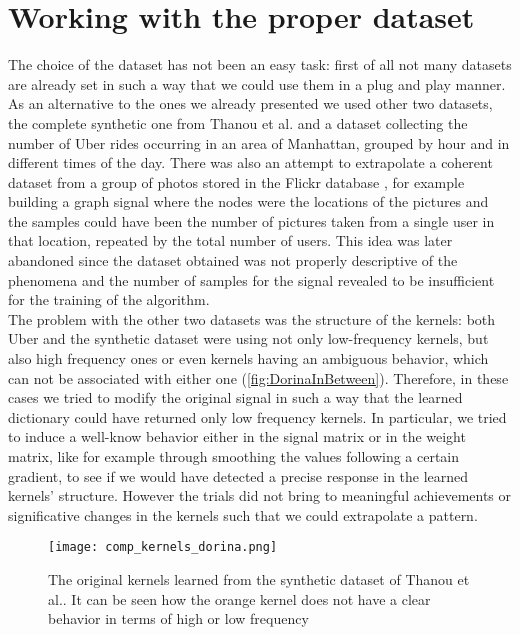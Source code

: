\section{Working with the proper dataset}
The choice of the dataset has not been an easy task: first of all not many datasets are already set in such a way that we could use them in a plug and play manner.\\
As an alternative to the ones we already presented we used other two datasets, the complete synthetic one from Thanou et al. and a dataset collecting the number of Uber rides occurring in an area of Manhattan, grouped by hour and in different times of the day. There was also an attempt to extrapolate a coherent dataset from a group of photos stored in the Flickr database \cite{McAuley2012}, for example building a graph signal where the nodes were the locations of the pictures and the samples could have been the number of pictures taken from a single user in that location, repeated by the total number of users. This idea was later abandoned since the dataset obtained was not properly descriptive of the phenomena and the number of samples for the signal revealed to be insufficient for the training of the algorithm.\\

The problem with the other two datasets was the structure of the kernels: both Uber and the synthetic dataset were using not only low-frequency kernels, but also high frequency ones or even kernels having an ambiguous behavior, which can not be associated with either one (\autoref{fig:DorinaInBetween}). Therefore, in these cases we tried to modify the original signal in such a way that the learned dictionary could have returned only low frequency kernels. In particular, we tried to induce a well-know behavior either in the signal matrix or in the weight matrix, like for example through smoothing the values following a certain gradient, to see if we would have detected a precise response in the learned kernels' structure. However the trials did not bring to meaningful achievements or significative changes in the kernels such that we could extrapolate a pattern.

\begin{figure}[tb]
  \centering
  \texttt{[image: comp\_kernels\_dorina.png]}
  \caption{The original kernels learned from the synthetic dataset of Thanou et al.. It can be seen how the orange kernel does not have a clear behavior in terms of high or low frequency}
  \label{fig:DorinaInBetween}
\end{figure}

